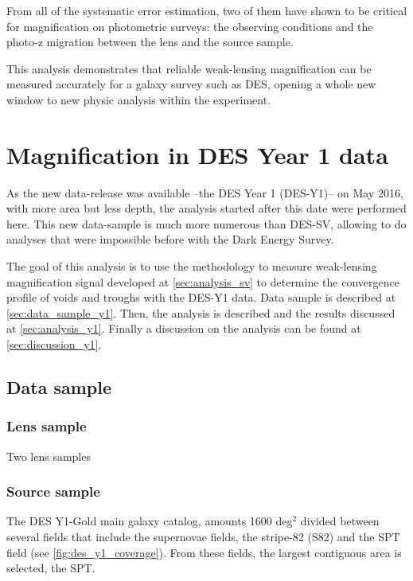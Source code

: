 From all of the systematic error estimation, two of them have shown to be critical for magnification on photometric surveys: the observing conditions and the photo-z migration between the lens and the source sample.
\newline

This analysis demonstrates that reliable weak-lensing magnification can be measured accurately for a galaxy survey such as DES, opening a whole new window to new physic analysis within the experiment.


\section{Magnification in DES Year 1 data}
\label{sec:y1data}
As the new data-release was available --the DES Year 1 (DES-Y1)-- on May 2016, with more area but less depth, the analysis started after this date were performed here. This new data-sample is much more numerous than DES-SV, allowing to do analyses that were impossible before with the Dark Energy Survey.
\newline

The goal of this analysis is to use the methodology to measure weak-lensing magnification signal developed at \autoref{sec:analysis_sv} to determine the convergence profile of voids and troughs with the DES-Y1 data. Data sample is described at \autoref{sec:data_sample_y1}. Then, the analysis is described and the results discussed at \autoref{sec:analysis_y1}. Finally a discussion on the analysis can be found at \autoref{sec:discussion_y1}.

\subsection{Data sample}
\label{sec:data_sample_y1}


\subsubsection{Lens sample}
Two lens samples

\subsubsection{Source sample}
The DES Y1-Gold main galaxy catalog, amounts 1600 deg$^2$ divided between several fields that include the supernovae fields, the stripe-82 (S82) and the SPT field (see \autoref{fig:des_y1_coverage}). From these fields, the largest contiguous area is selected, the SPT.
\newline

